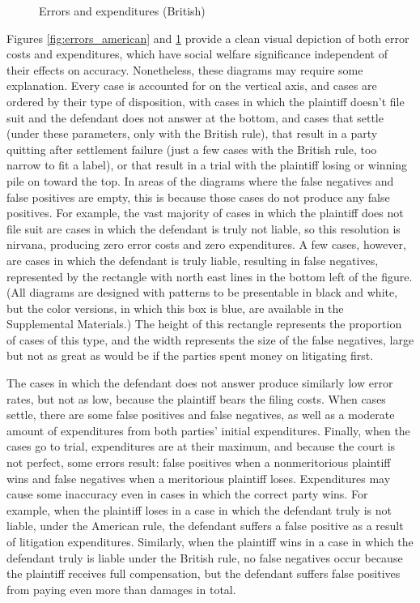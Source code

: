 \documentclass{article}
\begin{document}
\begin{figure}
\begin{minipage}{0.48\textwidth}
        \caption{Errors and expenditures (British)}
		\label{fig:errors_british}
    \end{minipage}
\end{figure}

Figures \ref{fig:errors_american} and \ref{fig:errors_british} provide a clean visual depiction of both error costs and expenditures, which have social welfare significance independent of their effects on accuracy. Nonetheless, these diagrams may require some explanation. Every case is accounted for on the vertical axis, and cases are ordered by their type of disposition, with cases in which the plaintiff doesn't file suit and the defendant does not answer at the bottom, and cases that settle (under these parameters, only with the British rule), that result in a party quitting after settlement failure (just a few cases with the British rule, too narrow to fit a label), or that result in a trial with the plaintiff losing or winning pile on toward the top. In areas of the diagrams where the false negatives and false positives are empty, this is because those cases do not produce any false positives. For example, the vast majority of cases in which the plaintiff does not file suit are cases in which the defendant is truly not liable, so this resolution is nirvana, producing zero error costs and zero expenditures. A few cases, however, are cases in which the defendant is truly liable, resulting in false negatives, represented by the rectangle with north east lines in the bottom left of the figure. (All diagrams are designed with patterns to be presentable in black and white, but the color versions, in which this box is blue, are available in the Supplemental Materials.) The height of this rectangle represents the proportion of cases of this type, and the width represents the size of the false negatives, large but not as great as would be if the parties spent money on litigating first. 

The cases in which the defendant does not answer produce similarly low error rates, but not as low, because the plaintiff bears the filing costs. When cases settle, there are some false positives and false negatives, as well as a moderate amount of expenditures from both parties' initial expenditures. Finally, when the cases go to trial, expenditures are at their maximum, and because the court is not perfect, some errors result: false positives when a nonmeritorious plaintiff wins and false negatives when a meritorious plaintiff loses. Expenditures may cause some inaccuracy even in cases in which the correct party wins. For example, when the plaintiff loses in a case in which the defendant truly is not liable, under the American rule, the defendant suffers a false positive as a result of litigation expenditures. Similarly, when the plaintiff wins in a case in which the defendant truly is liable under the British rule, no false negatives occur because the plaintiff receives full compensation, but the defendant suffers false positives from paying even more than damages in total.
\end{document}
